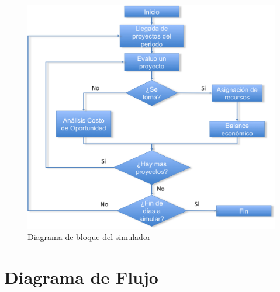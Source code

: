 \begin{figure}[H]
\begin{center}
 \includegraphics[width=\textwidth,height=\textheight,keepaspectratio]{./images/bloques.png}
\end{center}

\caption{Diagrama de bloque del simulador}
\label{fig:bloque}
\end{figure}


\section{Diagrama de Flujo}

